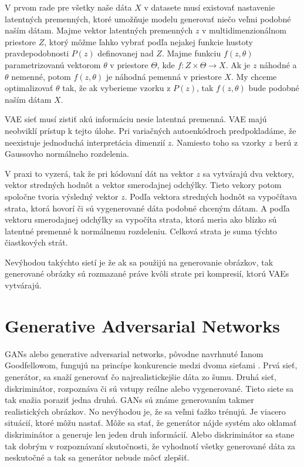 V prvom rade pre všetky naše dáta \(X\) v datasete musí existovať nastavenie latentných premenných, ktoré umožňuje modelu generovať niečo veľmi podobné naším dátam.
Majme vektor latentných premenných \(z\) v multidimenzionálnom priestore \(Z\), ktorý môžme ľahko vybrať podľa nejakej funkcie hustoty pravdepodobnosti \(P(z)\) definovanej nad \(Z\).
Majme funkciu \(f(z, \theta)\) parametrizovanú vektorom \(\theta\) v priestore \(\Theta\), kde \(f: Z \times \Theta \rightarrow X\).
Ak je \(z\) náhodné a \(\theta\) nemenné, potom \(f(z, \theta)\) je náhodná pemenná v priestore \(X\).
My chceme optimalizovať \(\theta\) tak, že ak vyberieme vzorku z \(P(z)\), tak \(f(z, \theta)\) bude podobné naším dátam \(X\).

VAE sieť musí zistiť akú informáciu nesie latentná premenná.
VAE majú neobviklí prístup k tejto úlohe.
Pri variačných autoenkódroch predpokladáme, že neexistuje jednoduchá interpretácia dimenzií \(z\).
Namiesto toho sa vzorky \(z\) berú z Gaussovho normálneho rozdelenia.

V praxi to vyzerá, tak že pri kódovaní dát na vektor \(z\) sa vytvárajú dva vektory, vektor stredných hodnôt a vektor smerodajnej odchýlky.
Tieto vekory potom spoločne tvoria výsledný vektor \(z\).
Podľa vektora stredných hodnôt sa vypočítava strata, ktorá hovorí či sú vygenerované dáta podobné chceným dátam.
A podľa vektoru smerodajnej odchýlky sa vypočíta strata, ktorá meria ako blízko sú latentné premenné k normálnemu rozdeleniu.
Celková strata je suma týchto čiastkových strát.

Nevýhodou takýchto sietí je že ak sa použijú na generovanie obrázkov, tak generované obrázky sú rozmazané práve kvôli strate pri kompresií, ktorú VAEs vytvárajú.

\section{Generative Adversarial Networks}
GANs alebo generative adversarial networks, pôvodne navrhnuté Ianom Goodfellowom, fungujú na princípe konkurencie medzi dvoma sieťami \cite{GAN}.
Prvá sieť, generátor, sa snaží generovať čo najrealistickejšie dáta zo šumu. Druhá sieť, diskriminátor,  rozpoznáva či sú vstupy reálne alebo vygenerované.
Tieto siete sa tak snažia poraziť jedna druhú. GANs sú známe generovaním takmer realistických obrázkov.
No nevýhodou je, že sa veľmi ťažko trénujú. Je viacero situácií, ktoré môžu nastať. Môže sa stať, že generátor nájde systém ako oklamať diskriminátor a generuje len jeden druh informácií.
Alebo diskriminátor sa stane tak dobrým v rozpoznávaní skutočnosti, že vyhodnotí všetky generované dáta za neskutočné a tak sa generátor nebude môcť zlepšiť.

